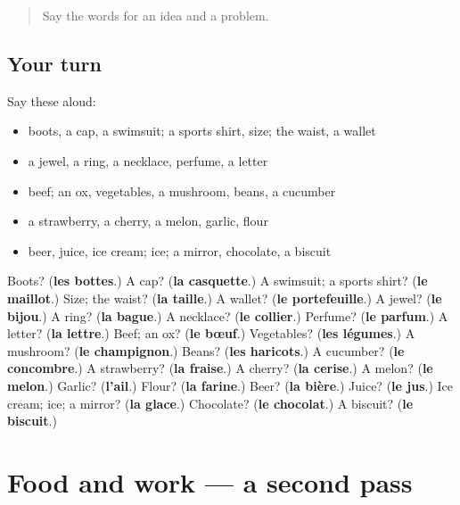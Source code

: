 \label{lesson:FR-R127-first-pass-clothes-and-things-you-carry}



\begin{quote}
Say the words for an idea and a problem.
\end{quote}

\subsection*{Your turn}
Say these aloud:

\begin{itemize}
\raggedright
  \item boots, a cap, a swimsuit; a sports shirt, size; the waist, a wallet
  \item a jewel, a ring, a necklace, perfume, a letter
  \item beef; an ox, vegetables, a mushroom, beans, a cucumber
  \item a strawberry, a cherry, a melon, garlic, flour
  \item beer, juice, ice cream; ice; a mirror, chocolate, a biscuit
\end{itemize}

\begin{tcolorbox}[breakable,colback=teal!4,colframe=teal!35!black,title={Before you move on}]
Boots? (\textbf{les bottes}.) A cap? (\textbf{la casquette}.) A swimsuit; a sports shirt? (\textbf{le maillot}.) Size; the waist? (\textbf{la taille}.) A wallet? (\textbf{le portefeuille}.) A jewel? (\textbf{le bijou}.) A ring? (\textbf{la bague}.) A necklace? (\textbf{le collier}.) Perfume? (\textbf{le parfum}.) A letter? (\textbf{la lettre}.) Beef; an ox? (\textbf{le bœuf}.) Vegetables? (\textbf{les légumes}.) A mushroom? (\textbf{le champignon}.) Beans? (\textbf{les haricots}.) A cucumber? (\textbf{le concombre}.) A strawberry? (\textbf{la fraise}.) A cherry? (\textbf{la cerise}.) A melon? (\textbf{le melon}.) Garlic? (\textbf{l'ail}.) Flour? (\textbf{la farine}.) Beer? (\textbf{la bière}.) Juice? (\textbf{le jus}.) Ice cream; ice; a mirror? (\textbf{la glace}.) Chocolate? (\textbf{le chocolat}.) A biscuit? (\textbf{le biscuit}.)
\end{tcolorbox}
\section[(dialogue)]{Food and work — a second pass}

\label{lesson:FR-R127-second-pass-food-and-work}



